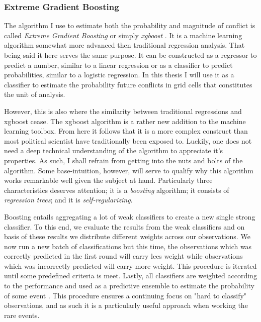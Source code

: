 \documentclass[a4paper]{article}
\begin{document}

\subsubsection{Extreme Gradient Boosting}\label{xgboost}

The algorithm I use to estimate both the probability and magnitude of conflict is called \emph{Extreme Gradient Boosting} or simply \emph{xgboost} \citep{Chen_2016}. It is a machine learning algorithm somewhat more advanced then traditional regression analysis. That being said it here serves the same purpose. It can be constructed as a regressor to predict a number, similar to a linear regression or as a classifier to predict probabilities, similar to a logistic regression. In this thesis I will use it as a classifier to estimate the probability future conflicts in grid cells that constitutes the unit of analysis.\par

However, this is also where the similarity between traditional regressions and xgboost cease. The xgboost algorithm is a rather new addition to the machine learning toolbox. From here it follows that it is a more complex construct than most political scientist have traditionally been exposed to. Luckily, one does not need a deep technical understanding of the algorithm to appreciate it's properties. As such, I shall refrain from getting into the nuts and bolts of the algorithm. Some base-intuition, however, will serve to qualify why this algorithm works remarkable well given the subject at hand. Particularly three characteristics deserves attention; it is a \emph{boosting} algorithm; it consists of \emph{regression trees}; and it is \emph{self-regularizing}.\par

Boosting entails aggregating a lot of weak classifiers to create a new single strong classifier. To this end, we evaluate the results from the weak classifiers and on basis of these results we distribute different weights across our observations. We now run a new batch of classifications but this time, the observations which was correctly predicted in the first round will carry lees weight while observations which was incorrectly predicted will carry more weight. This procedure is iterated until some predefined criteria is meet. Lastly, all classifiers are weighted according to the performance and used as a predictive ensemble to estimate the probability of some event \citep[338-339]{Friedman_2001}. This procedure ensures a continuing focus on "hard to classify" observations, and as such it is a particularly useful approach when working the rare events.\par
\end{document}
